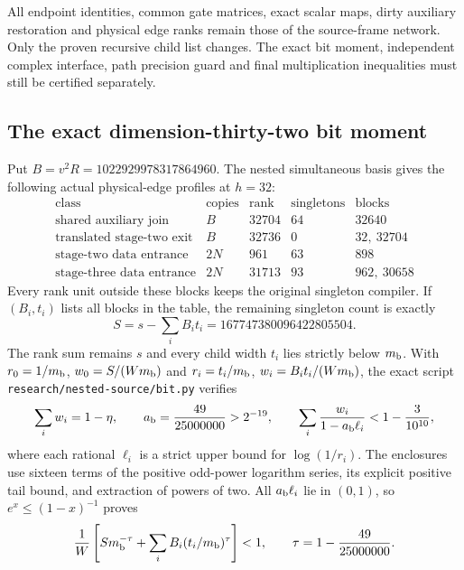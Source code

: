 All endpoint identities, common gate matrices, exact scalar maps, dirty
auxiliary restoration and physical edge ranks remain those of the
source-frame network. Only the proven recursive child list changes.
The exact bit moment, independent complex interface, path precision guard
and final multiplication inequalities must still be certified separately.

\subsection{The exact dimension-thirty-two bit moment}
\label{sec:nested-bit-moment}

Put $B=v^2R=1022929978317864960$. The nested simultaneous basis gives the
following actual physical-edge profiles at $h=32$:
\[
\begin{array}{c|r|r|r|l}
\text{class}&\text{copies}&\text{rank}&\text{singletons}&\text{blocks}\\\hline
\text{shared auxiliary join}&B&32704&64&32640\\
\text{translated stage-two exit}&B&32736&0&32,\ 32704\\
\text{stage-two data entrance}&2N&961&63&898\\
\text{stage-three data entrance}&2N&31713&93&962,\ 30658
\end{array}
\]
Every rank unit outside these blocks keeps the original singleton compiler.
If $(B_i,t_i)$ lists all blocks in the table, the remaining singleton count
is exactly
\[
 S=s-\sum_iB_it_i=167747380096422805504.
\]
The rank sum remains $s$ and every child width $t_i$ lies strictly below
$m_{\rm b}$. With $r_0=1/m_{\rm b}$, $w_0=S/(Wm_{\rm b})$ and
$r_i=t_i/m_{\rm b}$, $w_i=B_it_i/(Wm_{\rm b})$, the exact script
\texttt{research/nested-source/bit.py} verifies
\[
 \sum_iw_i=1-\eta,
 \qquad a_{\rm b}=\frac{49}{25000000}>2^{-19},
 \qquad
 \sum_i\frac{w_i}{1-a_{\rm b}\ell_i}<1-\frac3{10^{10}},
\]
where each rational $\ell_i$ is a strict upper bound for $\log(1/r_i)$.
The enclosures use sixteen terms of the positive odd-power logarithm series,
its explicit positive tail bound, and extraction of powers of two. All
$a_{\rm b}\ell_i$ lie in $(0,1)$, so $e^x\le(1-x)^{-1}$ proves
\[
 \frac1W\left[S m_{\rm b}^{-\tau}
             +\sum_iB_i(t_i/m_{\rm b})^\tau\right]<1,
 \qquad \tau=1-\frac{49}{25000000}.
\]

